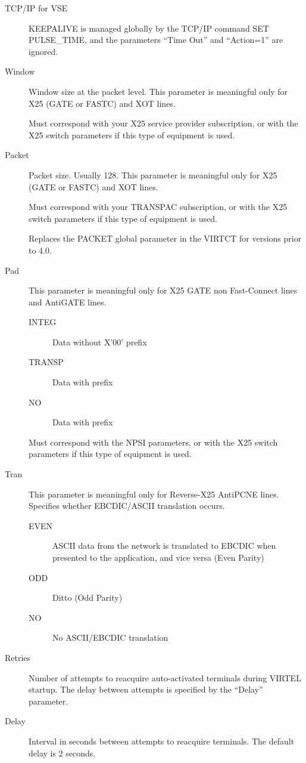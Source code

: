 \documentclass[letterpaper,10pt,english]{sphinxmanual}
\begin{document}
\begin{description}
\item[{TCP/IP for VSE}] \leavevmode
KEEPALIVE is managed globally by the TCP/IP command SET PULSE\_TIME,
and the parameters “Time Out” and “Action=1” are ignored.

\item[{Window}] \leavevmode
Window size at the packet level. This parameter is meaningful only
for X25 (GATE or FASTC) and XOT lines.

Must correspond with your X25 service provider subscription, or with
the X25 switch parameters if this type of equipment is used.

\item[{Packet}] \leavevmode
Packet size. Usually 128. This parameter is meaningful only for X25
(GATE or FASTC) and XOT lines.

Must correspond with your TRANSPAC subscription, or with the X25
switch parameters if this type of equipment is used.

Replaces the PACKET global parameter in the VIRTCT for versions
prior to 4.0.

\item[{Pad}] \leavevmode
This parameter is meaningful only for X25 GATE non Fast-Connect
lines and AntiGATE lines.
\begin{description}
\item[{INTEG}] \leavevmode
Data without X’00’ prefix

\item[{TRANSP}] \leavevmode
Data with prefix

\item[{NO}] \leavevmode
Data with prefix

\end{description}

Must correspond with the NPSI parameters, or with the X25 switch
parameters if this type of equipment is used.

\item[{Tran}] \leavevmode
This parameter is meaningful only for Reverse-X25 AntiPCNE lines.
Specifies whether EBCDIC/ASCII translation occurs.
\begin{description}
\item[{EVEN}] \leavevmode
ASCII data from the network is translated to EBCDIC when presented
to the application, and vice versa (Even Parity)

\item[{ODD}] \leavevmode
Ditto (Odd Parity)

\item[{NO}] \leavevmode
No ASCII/EBCDIC translation

\end{description}

\item[{Retries}] \leavevmode
Number of attempts to reacquire auto-activated terminals during
VIRTEL startup. The delay between attempts is specified by the
“Delay” parameter.

\item[{Delay}] \leavevmode
Interval in seconds between attempts to reacquire terminals. The
default delay is 2 seconds.

\end{description}
\end{document}
